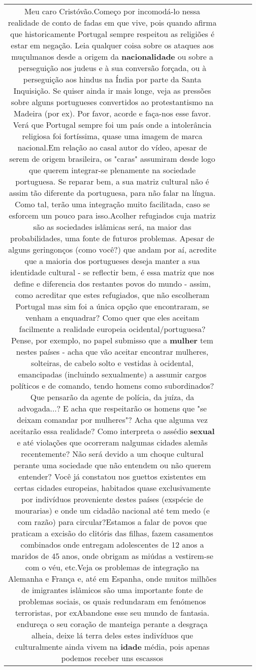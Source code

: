 \documentclass[11pt]{article}
\newlength\mylength
\begin{document}
\begin{center}
\begin{longtable}{|C{.65\mylength}|C{.30\mylength}|C{.12\mylength}|C{.12\mylength}|C{.12\mylength}|}
  \small Meu caro Cristóvão.Começo por incomodá-lo nessa realidade de  conto de fadas em que vive, pois quando afirma que historicamente Portugal sempre respeitou as religiões é estar em negação. Leia qualquer coisa sobre os ataques aos muçulmanos desde a origem da \textbf{nacionalidade} ou sobre a perseguição aos judeus e à sua conversão forçada, ou à perseguição aos hindus na Índia por parte da Santa Inquisição. Se quiser ainda ir mais longe, veja as pressões sobre alguns portugueses convertidos ao protestantismo na Madeira (por ex). Por favor, acorde e faça-nos esse favor. Verá que Portugal sempre foi um país onde a intolerância religiosa foi fortíssima, quase uma imagem de marca nacional.Em relação ao casal autor do vídeo, apesar de serem de origem brasileira, os "caras" assumiram desde logo que querem integrar-se plenamente na sociedade portuguesa. Se reparar bem, a sua matriz cultural não é assim tão diferente da portuguesa, para não falar na língua. Como tal, terão uma integração muito facilitada, caso se esforcem um pouco para isso.Acolher refugiados cuja matriz são as sociedades islâmicas será, na maior das probabilidades, uma fonte de futuros problemas. Apesar de alguns geringonços (como você?) que andam por aí, acredite que a maioria dos portugueses deseja manter a sua identidade cultural - se reflectir bem, é essa matriz que nos define e diferencia dos restantes povos do mundo - assim, como acreditar que estes refugiados, que não escolheram Portugal mas sim foi a única opção que encontraram, se venham a enquadrar? Como quer que eles aceitam facilmente a realidade europeia ocidental/portuguesa? Pense, por exemplo, no papel submisso que a \textbf{mulher} tem nestes países - acha que vão aceitar encontrar mulheres,  solteiras, de cabelo solto e vestidas à ocidental, emancipadas (incluindo sexualmente) a assumir cargos políticos e de comando, tendo homens como subordinados? Que pensarão da agente de polícia, da juíza, da advogada...? E acha que respeitarão os homens que "se deixam comandar por mulheres"? Acha que alguma vez aceitarão essa realidade? Como interpreta o assédio \textbf{sexual} e até violações que ocorreram nalgumas cidades alemãs recentemente? Não será devido a um choque cultural perante uma sociedade que não entendem ou não querem entender? Você já constatou nos guettos existentes em certas cidades europeias, habitados quase exclusivamente por indivíduos proveniente destes países (exspécie de mourarias) e onde um cidadão nacional até tem medo (e com razão) para circular?Estamos a falar de povos que praticam a excisão do clitóris das filhas, fazem casamentos combinados onde entregam adolescentes de 12 anos a maridos de 45 anos, onde obrigam as miúdas a vestirem-se com o véu, etc.Veja os problemas de integração na Alemanha e França e, até em Espanha, onde muitos milhões de imigrantes islâmicos são uma importante fonte de problemas sociais, os quais redundaram em fenómenos terroristas, por exAbandone esse seu mundo de fantasia. endureça o seu coração de manteiga perante a desgraça alheia, deixe lá terra deles estes indivíduos que culturalmente ainda vivem na \textbf{idade} média, pois apenas podemos receber uns escassos 
\end{longtable}
\end{center}
\end{document}
